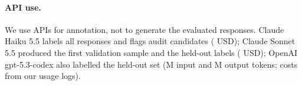 \paragraph{API use.}
We use APIs for annotation, not to generate the evaluated responses. Claude Haiku 5.5 labels all responses and flags audit candidates (\WHaikuCost{} USD); Claude Sonnet 5.5 produced the first validation sample and the held-out labels (\WSonnetCost{} USD); OpenAI gpt-5.3-codex also labelled the held-out set (\WCodexIn{}M input and \WCodexOut{}M output tokens; costs from our usage logs).

